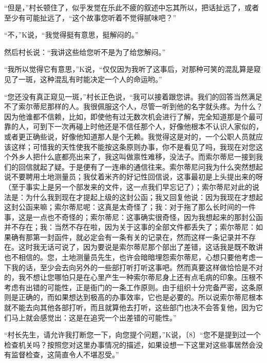 \documentclass[12pt,a4paper]{article}
\begin{document}
“但是，”村长顿住了，似乎发觉在乐此不疲的叙述中忘其所以，把话扯远了，或者至少有可能扯远了，“这个故事您听着不觉得腻味吧？”



“不，”K说，“我觉得挺有意思，挺解闷的。”



然后村长说：“我讲这些给您听不是为了给您解闷。”



“我所以觉得它有意思，”K说，“仅仅因为我听了这事后，对那种可笑的混乱算是窥见了一斑，这种混乱有时能决定一个人的命运哟。”



“您还没有真正窥见一斑，”村长正色说，“我可以接着跟您讲。我们的回答当然满足不了索尔蒂尼那样的人。我很佩服这个人，尽管一听到他的名字就头疼。为什么？因为他谁都不信赖，比如，即使他有过无数次机会进行了解，完全知道那是个最可靠的人，可到下一次再碰上时他还是不信任那个人，好像他根本不认识人家似的，或者更正确些说，好像他知道那人是个无赖。我觉得这是对的，一个公职人员就应该这样；可惜我的天性使我不能按这条原则办事，你不是看见了吗，我现在对您这个外乡人把什么底都亮出来了，我这叫做禀性难移，没法子。而索尔蒂尼一接到我们的回信就起了疑。于是便有了一连串的通信往来。索尔蒂尼问我为什么突然想起说不要聘用土地测量员；我仗着米齐的好记性回信说，这事最初是上头提出来的呀（至于事实上是另一个部发来的文件，这一点我们早忘记了）；索尔蒂尼对此的说法是：为什么我到现在才提起上级的这封公函；我又回复他说：因为我现在才想起这封公函来嘛；索尔蒂尼呢：这真是太奇怪了；我：对于拖了那么长时间的一件事，这是一点也不奇怪的；索尔蒂尼：这事确实很奇怪，因为我想起来的那封公函并不存在；我：当然不存在啦，因为关于这事的全部文件都丢失了；索尔蒂尼：如果确有那第一封函件，就必定会有一条有关的记录在，然而这样一条记录并不存在。这时我无话可说了，因为要说是索尔蒂尼那个部出了差错，这话我是既不敢讲也不相信的。您，土地测量员先生，也许会暗暗埋怨索尔蒂尼，心想只要他考虑一下我的话，至少会去向另外的一些部打听打听这事吧。然而真要这样做恰恰是不对的，我不想让您哪怕只是在心里产生一种索尔蒂尼身上还有点毛病的印象。压根不考虑有出错的可能性，正是衙门的一条工作原则。由于组织十分完备严密，这条原则是正确的，而如果想达到极高的办事效率，它也是必要的。所以说索尔蒂尼根本就不能去向其他各部打听，而且就算他去打听，这些部门也决不会答复他，因为它们马上就会感觉出：这是在追究一个出差错的可能性。”



“村长先生，请允许我打断您一下，向您提个问题，”K说，〔8〕“您不是提到过一个检查机关吗？按照您对这里办事情况的描述，如果设想一下这里对这些事居然会没有监督检查，这简直令人不堪忍受。”
\end{document}
